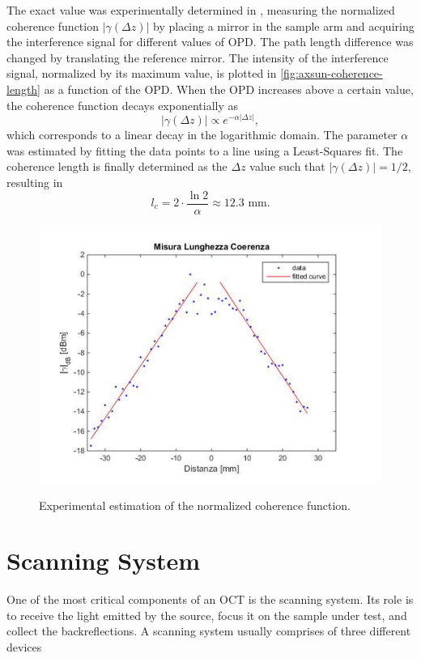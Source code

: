 The exact value was experimentally determined in \cite{Calabrese2017}, measuring the normalized coherence function $|\gamma(\Delta z)|$ by placing a mirror in the sample arm and acquiring the interference signal for different values of \ac{OPD}. The path length difference was changed by translating the reference mirror. The intensity of the interference signal, normalized by its maximum value, is plotted in  \autoref{fig:axsun-coherence-length} as a function of the \ac{OPD}. When the \ac{OPD} increases above a certain value, the coherence function decays exponentially as
\begin{equation}
|\gamma(\Delta z)| \propto e^{-\alpha |\Delta z|},
\end{equation}
which corresponds to a linear decay in the logarithmic domain. The parameter $\alpha$ was estimated by fitting the data points to a line using a Least-Squares fit. The coherence length is finally determined as the $\Delta z$ value such that $|\gamma(\Delta z)| = 1/2$, resulting in
\begin{equation}
	l_c = 2 \cdot \frac{\ln 2}{\alpha} \approx 12.3 \text{ mm.}
\end{equation}


\begin{figure}[hbt]
	\myfloatalign
	{\includegraphics[width=0.8\linewidth]{gfx/ch3/axsun-coherence-length}}\\
	\caption{Experimental estimation of the normalized coherence function.}\label{fig:axsun-coherence-length}
\end{figure}

\section{Scanning System}
One of the most critical components of an OCT is the scanning system. Its role is to receive the light emitted by the source, focus it on the sample under test, and collect the backreflections. A scanning system usually comprises of three different devices

